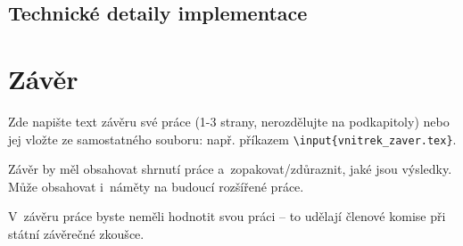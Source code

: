 \documentclass[a4paper,oneside,12pt]{book}
\begin{document}
\section{Technické detaily implementace}

\chapter*{Závěr}
%
Zde napište text závěru své práce (1-3 strany, nerozdělujte na podkapitoly) nebo jej vložte ze samostatného souboru: např. příkazem \texttt{\textbackslash input\{vnitrek\_zaver.tex\}}. \par Závěr by měl obsahovat shrnutí práce a~zopakovat/zdůraznit, jaké jsou výsledky. Může obsahovat i~náměty na budoucí rozšířené práce. \par V~závěru práce byste neměli hodnotit svou práci -- to udělají členové komise při státní závěrečné zkoušce.
%
%
\end{document}
